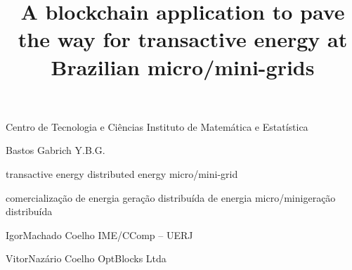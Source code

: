 
            {Centro de Tecnologia e Ciências}
            {Instituto de Matemática e Estatística}
            {}

      {Bastos Gabrich}
      {Y.B.G.}

\title{A blockchain application to pave the way for transactive energy at Brazilian micro/mini-grids}
         {transactive energy}
         {distributed energy}
         {micro/mini-grid}

               {comercialização de energia}
               {geração distribuída de energia}
               {micro/minigeração distribuída}

           {Igor}{Machado Coelho} 
           {IME/CComp -- UERJ} 

             {Vitor}{Nazário Coelho} 
             {OptBlocks Ltda}



